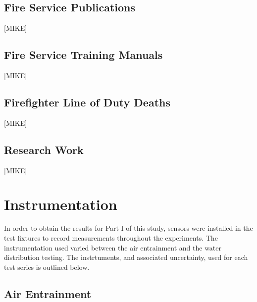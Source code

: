 \documentclass{article}
\begin{document}
\subsection{Fire Service Publications}

[MIKE]

\subsection{Fire Service Training Manuals}

[MIKE]

\subsection{Firefighter Line of Duty Deaths}

[MIKE]

\subsection{Research Work}

[MIKE]

\clearpage

\section{Instrumentation}

In order to obtain the results for Part I of this study, sensors were installed in the test fixtures to record measurements throughout the experiments. The instrumentation used varied between the air entrainment and the water distribution testing. The instrtuments, and associated uncertainty, used for each test series is outlined below.

\subsection{Air Entrainment}
\end{document}
